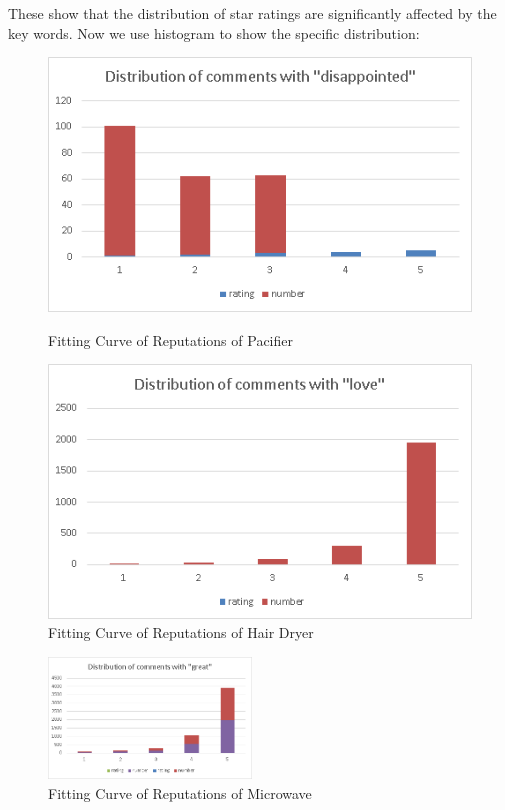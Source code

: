 \documentclass{mcmthesis}
\begin{document}
These show that the distribution of star ratings are significantly affected by the key words. Now we use histogram to show the specific distribution:
\\
\begin{figure}[H]
	\begin{minipage}[t]{0.48\linewidth}	
	\centering
	\includegraphics[width=1.0\textwidth]{figures/dis.png}
	\caption{Fitting Curve of Reputations of Pacifier}	  
	\end{minipage}
	\hfill
	\begin{minipage}[t]{0.48\linewidth}	
	\centering
	\includegraphics[width=1.0\textwidth]{figures/love.png}
	\caption{Fitting Curve of Reputations of Hair Dryer}	  
	\end{minipage}
	\end{figure}
	\begin{figure}[H]
	\centering
	\includegraphics[width=0.48\textwidth]{figures/great.png}
	\caption{Fitting Curve of Reputations of Microwave}	  
	\end{figure}
\end{document}
